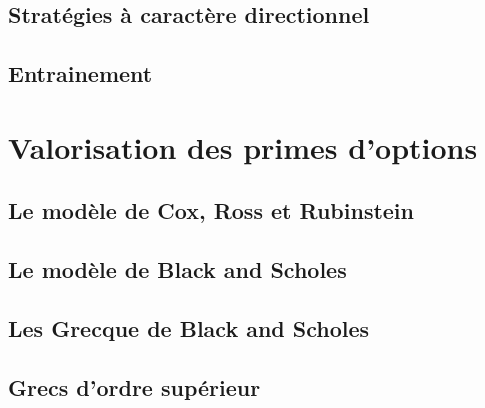 \documentclass[a4paper, 12pt]{report}
\begin{document}
\subsection{Stratégies à caractère directionnel}

\subsection{Entrainement}

\section{Valorisation des primes d'options}

\subsection{Le modèle de Cox, Ross et Rubinstein}

\subsection{Le modèle de Black and Scholes}

\subsection{Les Grecque de Black and Scholes}

\subsection{Grecs d'ordre supérieur}
\end{document}

